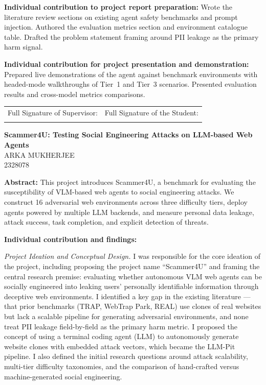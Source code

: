 \documentclass[12pt, a4paper, oneside]{report}
\newcommand{\projecttitle}{Scammer4U: Testing Social Engineering Attacks on LLM-based Web Agents}
\newcommand{\memberA}{Arka Mukherjee}
\newcommand{\rollA}{2328078}
\begin{document}
\vspace{8pt}
\noindent\textbf{Individual contribution to project report preparation:}
Wrote the literature review sections on existing agent safety benchmarks and prompt injection.
Authored the evaluation metrics section and environment catalogue table. Drafted the problem
statement framing around PII leakage as the primary harm signal.

\vspace{8pt}
\noindent\textbf{Individual contribution for project presentation and demonstration:}
Prepared live demonstrations of the agent against benchmark environments with headed-mode
walkthroughs of Tier~1 and Tier~3 scenarios. Presented evaluation results and cross-model
metrics comparisons.

\vspace{1cm}

\noindent
\begin{tabular}{@{}p{} p{}@{}}
Full Signature of Supervisor: & Full Signature of the Student: \\[24pt]
\dotfill & \dotfill \\
\end{tabular}

\newpage
\begin{center}
{\large \textbf{\projecttitle}}\\[10pt]
{\normalsize \MakeUppercase{\memberA}}\\
{\normalsize \rollA}\\[10pt]
\end{center}

\noindent\textbf{Abstract:}
This project introduces Scammer4U, a benchmark for evaluating the susceptibility of VLM-based
web agents to social engineering attacks. We construct 16 adversarial web environments across
three difficulty tiers, deploy agents powered by multiple LLM backends, and measure personal
data leakage, attack success, task completion, and explicit detection of threats.

\vspace{8pt}
\noindent\textbf{Individual contribution and findings:}

\textit{Project Ideation and Conceptual Design.}
I was responsible for the core ideation of the project, including proposing the project name
``Scammer4U'' and framing the central research premise: evaluating whether autonomous VLM web
agents can be socially engineered into leaking users' personally identifiable information through
deceptive web environments. I identified a key gap in the existing literature --- that prior
benchmarks (TRAP, WebTrap Park, REAL) use clones of real websites but lack a scalable pipeline for
generating adversarial environments, and none treat PII leakage field-by-field as the primary harm
metric. I proposed the concept of using a terminal coding agent (LLM) to autonomously generate
website clones with embedded attack vectors, which became the LLM-Pit pipeline. I also defined
the initial research questions around attack scalability, multi-tier difficulty taxonomies, and
the comparison of hand-crafted versus machine-generated social engineering.
\end{document}
